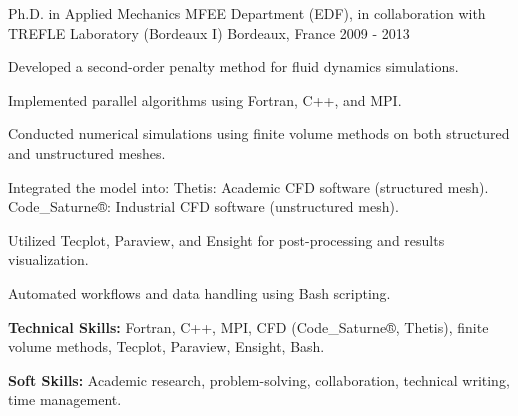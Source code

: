 \begin{cventries}
  \cventry
    {Ph.D. in Applied Mechanics} %
    {MFEE Department (EDF), in collaboration with TREFLE Laboratory (Bordeaux I)} %
    {Bordeaux, France} %
    {2009 - 2013} %
    {
      \begin{cvitems} %
        \item {Developed a second-order penalty method for fluid dynamics simulations.}
        \item {Implemented parallel algorithms using Fortran, C++, and MPI.}
        \item {Conducted numerical simulations using finite volume methods on both structured and unstructured meshes.}
        \item {Integrated the model into: Thetis: Academic CFD software (structured mesh). Code\_Saturne®: Industrial CFD software (unstructured mesh).}
        \item {Utilized Tecplot, Paraview, and Ensight for post-processing and results visualization.}
        \item {Automated workflows and data handling using Bash scripting.}
        \item {\textbf{Technical Skills:} Fortran, C++, MPI, CFD (Code\_Saturne®, Thetis), finite volume methods, Tecplot, Paraview, Ensight, Bash.}
        \item {\textbf{Soft Skills:} Academic research, problem-solving, collaboration, technical writing, time management.}
      \end{cvitems}
    }

\end{cventries}
